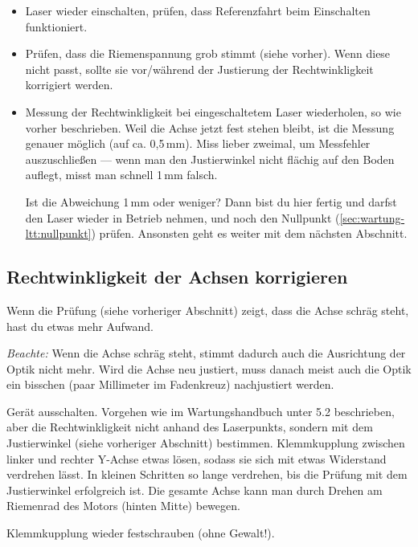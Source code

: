 \documentclass{\basedir/fablab-document}
\begin{document}
\begin{itemize}
		\item Laser wieder einschalten, prüfen, dass Referenzfahrt beim Einschalten funktioniert.

		\item Prüfen, dass die Riemenspannung grob stimmt (siehe vorher). Wenn diese nicht passt, sollte sie vor/während der Justierung der Rechtwinkligkeit korrigiert werden.

		\item Messung der Rechtwinkligkeit bei eingeschaltetem Laser wiederholen, so wie vorher beschrieben. Weil die Achse jetzt fest stehen bleibt, ist die Messung genauer möglich (auf ca. 0,5\,mm). Miss lieber zweimal, um Messfehler auszuschließen --- wenn man den Justierwinkel nicht flächig auf den Boden auflegt, misst man schnell 1\,mm falsch.

		Ist die Abweichung 1\,mm oder weniger? Dann bist du hier fertig und darfst den Laser wieder in Betrieb nehmen, und noch den Nullpunkt (\cref{sec:wartung-ltt:nullpunkt}) prüfen. Ansonsten geht es weiter mit dem nächsten Abschnitt.
	\end{itemize}
\subsection{Rechtwinkligkeit der Achsen korrigieren}
	Wenn die Prüfung (siehe vorheriger Abschnitt) zeigt, dass die Achse schräg steht, hast du etwas mehr Aufwand.

	\emph{Beachte:} Wenn die Achse schräg steht, stimmt dadurch auch die Ausrichtung der Optik nicht mehr. Wird die Achse neu justiert, muss danach meist auch die Optik ein bisschen (paar Millimeter im Fadenkreuz) nachjustiert werden.

	Gerät ausschalten. Vorgehen wie im Wartungshandbuch unter 5.2 beschrieben, aber die Rechtwinkligkeit nicht anhand des Laserpunkts, sondern mit dem Justierwinkel (siehe vorheriger Abschnitt) bestimmen. Klemmkupplung zwischen linker und rechter Y-Achse etwas lösen, sodass sie sich mit etwas Widerstand verdrehen lässt. In kleinen Schritten so lange verdrehen, bis die Prüfung mit dem Justierwinkel erfolgreich ist. Die gesamte Achse kann man durch Drehen am Riemenrad des Motors (hinten Mitte) bewegen.

	Klemmkupplung wieder festschrauben (ohne Gewalt!).
\end{document}
